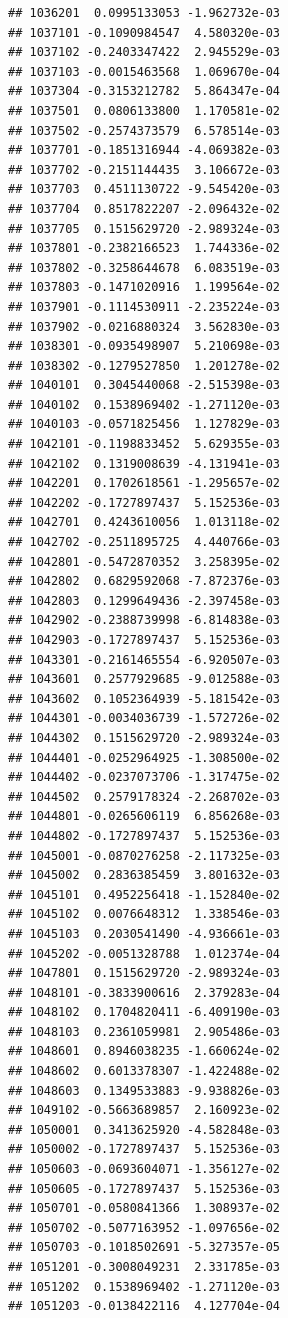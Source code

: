 \begin{frame}[fragile]
\begin{verbatim}
## 1036201  0.0995133053 -1.962732e-03
## 1037101 -0.1090984547  4.580320e-03
## 1037102 -0.2403347422  2.945529e-03
## 1037103 -0.0015463568  1.069670e-04
## 1037304 -0.3153212782  5.864347e-04
## 1037501  0.0806133800  1.170581e-02
## 1037502 -0.2574373579  6.578514e-03
## 1037701 -0.1851316944 -4.069382e-03
## 1037702 -0.2151144435  3.106672e-03
## 1037703  0.4511130722 -9.545420e-03
## 1037704  0.8517822207 -2.096432e-02
## 1037705  0.1515629720 -2.989324e-03
## 1037801 -0.2382166523  1.744336e-02
## 1037802 -0.3258644678  6.083519e-03
## 1037803 -0.1471020916  1.199564e-02
## 1037901 -0.1114530911 -2.235224e-03
## 1037902 -0.0216880324  3.562830e-03
## 1038301 -0.0935498907  5.210698e-03
## 1038302 -0.1279527850  1.201278e-02
## 1040101  0.3045440068 -2.515398e-03
## 1040102  0.1538969402 -1.271120e-03
## 1040103 -0.0571825456  1.127829e-03
## 1042101 -0.1198833452  5.629355e-03
## 1042102  0.1319008639 -4.131941e-03
## 1042201  0.1702618561 -1.295657e-02
## 1042202 -0.1727897437  5.152536e-03
## 1042701  0.4243610056  1.013118e-02
## 1042702 -0.2511895725  4.440766e-03
## 1042801 -0.5472870352  3.258395e-02
## 1042802  0.6829592068 -7.872376e-03
## 1042803  0.1299649436 -2.397458e-03
## 1042902 -0.2388739998 -6.814838e-03
## 1042903 -0.1727897437  5.152536e-03
## 1043301 -0.2161465554 -6.920507e-03
## 1043601  0.2577929685 -9.012588e-03
## 1043602  0.1052364939 -5.181542e-03
## 1044301 -0.0034036739 -1.572726e-02
## 1044302  0.1515629720 -2.989324e-03
## 1044401 -0.0252964925 -1.308500e-02
## 1044402 -0.0237073706 -1.317475e-02
## 1044502  0.2579178324 -2.268702e-03
## 1044801 -0.0265606119  6.856268e-03
## 1044802 -0.1727897437  5.152536e-03
## 1045001 -0.0870276258 -2.117325e-03
## 1045002  0.2836385459  3.801632e-03
## 1045101  0.4952256418 -1.152840e-02
## 1045102  0.0076648312  1.338546e-03
## 1045103  0.2030541490 -4.936661e-03
## 1045202 -0.0051328788  1.012374e-04
## 1047801  0.1515629720 -2.989324e-03
## 1048101 -0.3833900616  2.379283e-04
## 1048102  0.1704820411 -6.409190e-03
## 1048103  0.2361059981  2.905486e-03
## 1048601  0.8946038235 -1.660624e-02
## 1048602  0.6013378307 -1.422488e-02
## 1048603  0.1349533883 -9.938826e-03
## 1049102 -0.5663689857  2.160923e-02
## 1050001  0.3413625920 -4.582848e-03
## 1050002 -0.1727897437  5.152536e-03
## 1050603 -0.0693604071 -1.356127e-02
## 1050605 -0.1727897437  5.152536e-03
## 1050701 -0.0580841366  1.308937e-02
## 1050702 -0.5077163952 -1.097656e-02
## 1050703 -0.1018502691 -5.327357e-05
## 1051201 -0.3008049231  2.331785e-03
## 1051202  0.1538969402 -1.271120e-03
## 1051203 -0.0138422116  4.127704e-04

\end{verbatim}
\end{frame}
